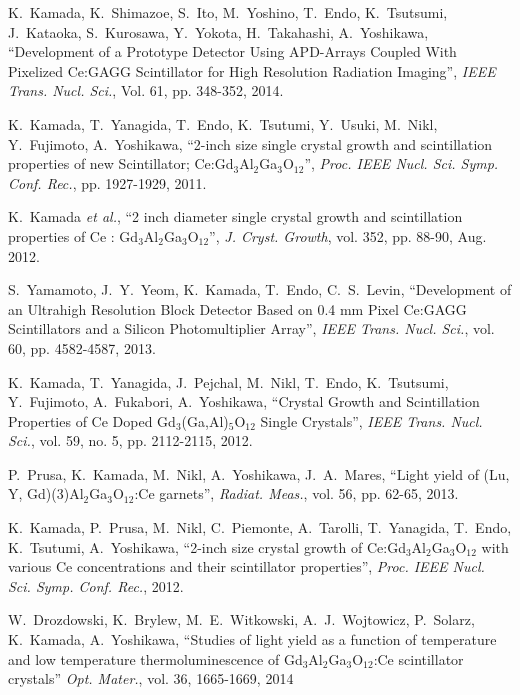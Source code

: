\documentclass[journal]{IEEEtran}
\begin{document}
\begin{thebibliography}{1}
K.~Kamada, K.~Shimazoe, S.~Ito, M.~Yoshino, T.~Endo, K.~Tsutsumi, J.~Kataoka, S.~Kurosawa, Y.~Yokota, H.~Takahashi, A.~Yoshikawa, ``Development of a Prototype Detector Using APD-Arrays Coupled With Pixelized Ce:GAGG Scintillator for High Resolution Radiation Imaging'', \emph{IEEE Trans. Nucl. Sci.}, Vol. 61, pp. 348-352, 2014. 

K.~Kamada, T.~Yanagida, T.~Endo, K.~Tsutumi, Y.~Usuki, M.~Nikl, Y.~Fujimoto, A.~Yoshikawa, ``2-inch size single crystal growth and scintillation properties of new Scintillator; Ce:Gd$_{3}$Al$_{2}$Ga$_{3}$O$_{12}$'', \emph{Proc. IEEE Nucl. Sci. Symp. Conf. Rec.}, pp. 1927-1929, 2011.

K.~Kamada \emph{et al.}, ``2 inch diameter single crystal growth and scintillation properties of Ce : Gd$_{3}$Al$_{2}$Ga$_{3}$O$_{12}$'', \emph{J. Cryst. Growth}, vol. 352, pp. 88-90, Aug. 2012.

S.~Yamamoto, J.~Y.~Yeom, K.~Kamada, T.~Endo, C.~S.~Levin, ``Development of an Ultrahigh Resolution Block Detector Based on 0.4 mm Pixel Ce:GAGG Scintillators and a Silicon Photomultiplier Array'', \emph{IEEE Trans. Nucl. Sci.}, vol. 60, pp. 4582-4587, 2013. 

K.~Kamada, T.~Yanagida, J.~Pejchal, M.~Nikl, T.~Endo, K.~Tsutsumi, Y.~Fujimoto, A.~Fukabori, A.~Yoshikawa, ``Crystal Growth and Scintillation Properties of Ce Doped Gd$_{3}$(Ga,Al)$_{5}$O$_{12}$ Single Crystals'', \emph{IEEE Trans. Nucl. Sci.}, vol. 59, no. 5, pp. 2112-2115, 2012.

P.~Prusa, K.~Kamada, M.~Nikl, A.~Yoshikawa, J.~A.~Mares, ``Light yield of (Lu, Y, Gd)(3)Al$_{2}$Ga$_{3}$O$_{12}$:Ce garnets'', \emph{Radiat. Meas.}, vol. 56, pp. 62-65, 2013. 

K.~Kamada, P.~Prusa, M.~Nikl, C.~Piemonte, A.~Tarolli, T.~Yanagida, T.~Endo, K.~Tsutumi, A.~Yoshikawa, ``2-inch size crystal growth of Ce:Gd$_{3}$Al$_{2}$Ga$_{3}$O$_{12}$ with various Ce concentrations and their scintillator properties'', \emph{Proc. IEEE Nucl. Sci. Symp. Conf. Rec.}, 2012. 

W.~Drozdowski, K.~Brylew, M.~E.~Witkowski, A.~J.~Wojtowicz, P.~Solarz, K.~Kamada, A.~Yoshikawa, ``Studies of light yield as a function of temperature and low temperature thermoluminescence of Gd$_{3}$Al$_{2}$Ga$_{3}$O$_{12}$:Ce scintillator crystals'' \emph{Opt. Mater.}, vol. 36, 1665-1669, 2014


\end{thebibliography}
\end{document}
